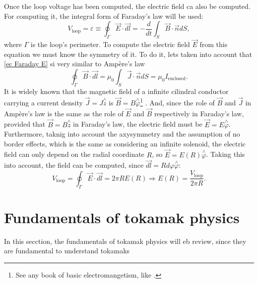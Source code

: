 \documentclass[a4paper,12pt,oneside]{book}
\begin{document}
Once the loop voltage has been computed, the electric field ca also be computed. For computing it, the integral form of Faraday's law will be used:
%
\begin{equation} \label{ec Faraday E}
V_\text{loop}=\varepsilon \equiv \oint_\Gamma \vec{E} \cdot \vec{dl}= -\dfrac{d}{dt} \int_S \vec{B} \cdot \vec{n} dS,
\end{equation}
where $\Gamma$ is the loop's perimeter. To compute the electric field $\vec{E}$ from this equation we must know the symmetry of it. To do it, lets taken into account that \eqref{ec Faraday E} si very similar to Ampère's law
%
\begin{equation}\label{ec Ampere}
\oint_\Gamma \vec{B} \cdot \vec{dl}=\mu_0 \int_S \vec{J} \cdot \vec{n} dS=\mu_0 I_\text{enclosed}.
\end{equation}
It is widely known that the magnetic field of a infinite cilindral conductor carrying a current density $\vec{J}=J \stackrel{\wedge}{z}$ is $\vec{B}=B \stackrel{\wedge}{\varphi}$\footnote{See any book of basic electromangetism, like \cite{Griffiths}.} . And, since the role of $\vec{B}$ and $\vec{J}$ in Ampère's law is the same as the role of $\vec{E}$ and $\vec{B}$ respectively in Faraday's law, provided that $\vec{B}=B \stackrel{\wedge}{z}$ in Faraday's law, the electric field must be $\vec{E}=E \stackrel{\wedge}{\varphi}$. Furthermore, taknig into account the axysymmetry and the assumption of no border effects, which is the same as considering an infinite solenoid, the electric field can only depend on the radial coordinate $R$, so $\vec{E}=E(R) \stackrel{\wedge}{\varphi}$. Taking this into account, the field can be computed, since $\vec{dl}=R d\varphi \stackrel{\wedge}{\varphi}$:
%
\begin{equation}
V_\text{loop} = \oint_\Gamma \vec{E} \cdot \vec{dl}= 2 \pi R E(R) \Rightarrow E(R)= \dfrac{V_\text{loop}}{2 \pi R}.
\end{equation}









\section{Fundamentals of tokamak physics}

In this secction, the fundamentals of tokamak physics will eb review, since they are fundamental to understand tokamaks
\end{document}
